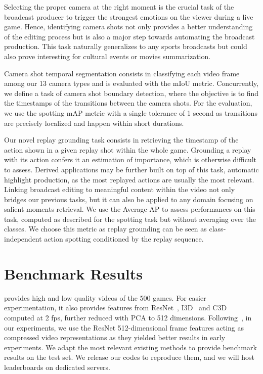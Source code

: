 \documentclass[final]{cvsports}
\begin{document}
\label{subsec-Camera shot segmentation and boundary detection}
Selecting the proper camera at the right moment is the crucial task of the broadcast producer to trigger the strongest emotions on the viewer during a live game. Hence, identifying camera shots not only provides a better understanding of the editing process but is also a major step towards automating the broadcast production. This task naturally generalizes to any sports broadcasts but could also prove interesting for \eg cultural events or movies summarization.


Camera shot temporal segmentation consists in classifying each video frame among our 13 camera types and is evaluated with the mIoU metric. Concurrently, we define a task of camera shot boundary detection, where the objective is to find the timestamps of the transitions between the camera shots. For the evaluation, we use the spotting mAP metric with a single tolerance  of 1 second as transitions 
are precisely localized and happen within short durations.



Our novel replay grounding task consists in retrieving the timestamp of the action shown in a given replay shot within the whole game. 
Grounding a replay with its action confers it an estimation of importance, which is otherwise difficult to assess. Derived applications may be further built on top of this task, \eg automatic highlight production, as the most replayed actions are usually the most relevant. Linking broadcast editing to meaningful content within the video not only bridges our previous tasks, but it can also be applied to any domain focusing on salient moments retrieval. 
We use the Average-AP to assess performances on this task, computed as described for the spotting task but without averaging over the classes. 
We choose this metric as replay grounding can be seen as class-independent action spotting conditioned by the replay sequence. \section{Benchmark Results}
\label{sec:Exp}

 \SoccerNet provides high and low quality videos of the 500 games. 
For easier experimentation, it also provides features from ResNet~\cite{He_2016_CVPR}, I3D~\cite{carreira2017quo} and C3D~\cite{tran2015learning} computed at 2 fps, further reduced with PCA to 512 dimensions.
Following~\cite{cioppa2020context,Giancola_2018_CVPR_Workshops}, in our experiments, we use the ResNet 512-dimensional frame features acting as compressed video representations as they yielded better results in early experiments. We adapt the most relevant existing methods to provide benchmark results on the \SoccerNet test set. We release our codes to reproduce them,
and we will host leaderboards on dedicated servers. 
\end{document}
